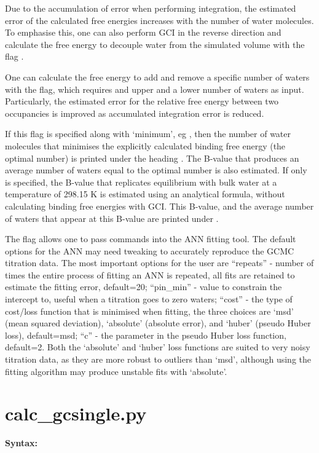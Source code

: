 \documentclass[letterpaper,10pt,english]{sphinxmanual}
\begin{document}
Due to the accumulation of error when performing integration, the estimated error of the calculated free energies increases with the number of water molecules. To emphasise this, one can also perform GCI in the reverse direction and calculate the free energy to decouple water from the simulated volume with the flag .

One can calculate the free energy to add and remove a specific number of waters with the  flag, which requires and upper and a lower number of waters as input. Particularly, the estimated error for the relative free energy between two occupancies is improved as accumulated integration error is reduced.

If this flag is specified along with `minimum', eg , then the number of water molecules that minimises the explicitly calculated binding free energy (the optimal number) is printed under the heading . The B-value that produces an average number of waters equal to the optimal number is also estimated. If only  is specified, the B-value that replicates equilibrium with bulk water at a temperature of 298.15 K is estimated using an analytical formula, without calculating binding free energies with GCI. This B-value, and the average number of waters that appear at this B-value are printed under .

The flag  allows one to pass commands into the ANN fitting tool. The default options for the ANN may need tweaking to accurately reproduce the GCMC titration data. The most important options for the user are “repeats'' - number of times the entire process of fitting an ANN is repeated, all fits are retained to estimate the fitting error, default=20; “pin\_min” - value to constrain the intercept to, useful when a titration goes to zero waters; “cost” - the type of cost/loss function that is minimised when fitting, the three choices are `msd' (mean squared deviation), `absolute' (absolute error), and `huber' (pseudo Huber loss), default=msd; “c” - the parameter in the pseudo Huber loss function, default=2. Both the `absolute' and `huber' loss functions are suited to very noisy titration data, as they are more robust to outliers than `msd', although using  the fitting algorithm may produce unstable fits with `absolute'.


\section{calc\_gcsingle.py}
\label{tools:calc-gcsingle-py}
\textbf{Syntax:}
\end{document}
